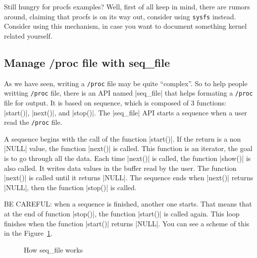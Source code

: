 \documentclass[10pt, oneside]{book}
\begin{document}
Still hungry for procfs examples?
Well, first of all keep in mind, there are rumors around, claiming that procfs is on its way out, consider using \verb|sysfs| instead.
Consider using this mechanism, in case you want to document something kernel related yourself.

\subsection{Manage /proc file with seq\_file}
\label{sec:manage_procfs_with_seq_file}
As we have seen, writing a \verb|/proc| file may be quite ``complex''.
So to help people writting \verb|/proc| file, there is an API named \cpp|seq_file| that helps formating a \verb|/proc| file for output.
It is based on sequence, which is composed of 3 functions: \cpp|start()|, \cpp|next()|, and \cpp|stop()|.
The \cpp|seq_file| API starts a sequence when a user read the \verb|/proc| file.

A sequence begins with the call of the function \cpp|start()|.
If the return is a non \cpp|NULL| value, the function \cpp|next()| is called.
This function is an iterator, the goal is to go through all the data.
Each time \cpp|next()| is called, the function \cpp|show()| is also called.
It writes data values in the buffer read by the user.
The function \cpp|next()| is called until it returns \cpp|NULL|.
The sequence ends when \cpp|next()| returns \cpp|NULL|, then the function \cpp|stop()| is called.

BE CAREFUL: when a sequence is finished, another one starts.
That means that at the end of function \cpp|stop()|, the function \cpp|start()| is called again.
This loop finishes when the function \cpp|start()| returns \cpp|NULL|.
You can see a scheme of this in the Figure~\ref{img:seqfile}.

\begin{figure}
  \center
  \caption{How seq\_file works}
  \label{img:seqfile}
\end{figure}
\end{document}
